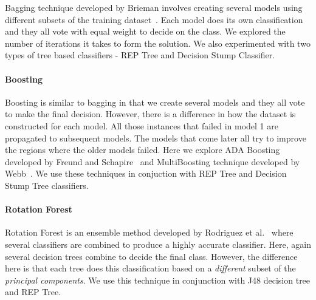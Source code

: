 Bagging technique developed by Brieman involves creating several models using different subsets of the training dataset~\cite{Bagging}. Each model does its own classification and they all vote with equal weight to decide on the class. We explored the number of iterations it takes to form the solution. We also experimented with two types of tree based classifiers - REP Tree and Decision Stump Classifier.


\paragraph{Boosting}

Boosting is similar to bagging in that we create several models and they all vote to make the final decision. However, there is a difference in how the dataset is constructed for each model. All those instances that failed in model 1 are propagated to subsequent models. The models that come later all try to improve the regions where the older models failed. Here we explore ADA Boosting developed by Freund and Schapire~\cite{ADABoosting} and MultiBoosting technique developed by Webb~\cite{MultiBoosting}. We use these techniques in conjuction with REP Tree and Decision Stump Tree classifiers.

\paragraph{Rotation Forest}

Rotation Forest is an ensemble method developed by Rodriguez et al.~\cite{RotationForest} where several classifiers are combined to produce a highly accurate classifier. Here, again several decision trees combine to decide the final class. However, the difference here is that each tree does this classification based on a \emph{different} subset of the \emph{principal components}. We use this technique in conjunction with J48 decision tree and REP Tree.


